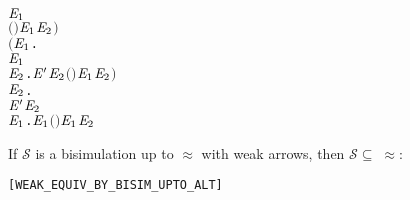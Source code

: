\begin{definition}
\begin{alltt}
                       \HOLTokenWeakTransBegin{} \HOLTokenWeakTransEnd \ensuremath{\HOLBoundVar{E}\sb{\mathrm{1}}} \HOLSymConst{\HOLTokenConj{}}
                      \ensuremath{(} \HOLSymConst{\HOLTokenRCompose{}}  \HOLSymConst{\HOLTokenRCompose{}} \ensuremath{)} \ensuremath{\HOLBoundVar{E}\sb{\mathrm{1}}} \ensuremath{\HOLBoundVar{E}\sb{\mathrm{2}}}\ensuremath{)} \HOLSymConst{\HOLTokenConj{}}
         \ensuremath{(}\HOLSymConst{\HOLTokenForall{}}\ensuremath{\HOLBoundVar{E}\sb{\mathrm{1}}}.
               \HOLTokenWeakTransBegin\HOLSymConst{\ensuremath{\tau}}\HOLTokenWeakTransEnd \ensuremath{\HOLBoundVar{E}\sb{\mathrm{1}}} \HOLSymConst{\HOLTokenImp{}}
              \HOLSymConst{\HOLTokenExists{}}\ensuremath{\HOLBoundVar{E}\sb{\mathrm{2}}}. \ensuremath{\HOLBoundVar{E}\sp{\prime}} \HOLSymConst{\HOLTokenEPS} \ensuremath{\HOLBoundVar{E}\sb{\mathrm{2}}} \HOLSymConst{\HOLTokenConj{}} \ensuremath{(} \HOLSymConst{\HOLTokenRCompose{}}  \HOLSymConst{\HOLTokenRCompose{}} \ensuremath{)} \ensuremath{\HOLBoundVar{E}\sb{\mathrm{1}}} \ensuremath{\HOLBoundVar{E}\sb{\mathrm{2}}}\ensuremath{)} \HOLSymConst{\HOLTokenConj{}}
         \HOLSymConst{\HOLTokenForall{}}\ensuremath{\HOLBoundVar{E}\sb{\mathrm{2}}}.
             \ensuremath{\HOLBoundVar{E}\sp{\prime}} \HOLTokenWeakTransBegin\HOLSymConst{\ensuremath{\tau}}\HOLTokenWeakTransEnd \ensuremath{\HOLBoundVar{E}\sb{\mathrm{2}}} \HOLSymConst{\HOLTokenImp{}}
             \HOLSymConst{\HOLTokenExists{}}\ensuremath{\HOLBoundVar{E}\sb{\mathrm{1}}}.  \HOLSymConst{\HOLTokenEPS} \ensuremath{\HOLBoundVar{E}\sb{\mathrm{1}}} \HOLSymConst{\HOLTokenConj{}} \ensuremath{(} \HOLSymConst{\HOLTokenRCompose{}}  \HOLSymConst{\HOLTokenRCompose{}} \ensuremath{)} \ensuremath{\HOLBoundVar{E}\sb{\mathrm{1}}} \ensuremath{\HOLBoundVar{E}\sb{\mathrm{2}}}
\end{alltt}
\end{definition}

\begin{theorem}
If $\mathcal{S}$ is a bisimulation up to $\approx$ with weak arrows, then
$\mathcal{S} \subseteq\;\approx$:
\begin{alltt}
\HOLTokenTurnstile{}   \HOLSymConst{\HOLTokenConj{}}    \HOLSymConst{\HOLTokenImp{}}  \HOLSymConst{\HOLTokenWeakEQ} \hfill{[WEAK_EQUIV_BY_BISIM_UPTO_ALT]}
\end{alltt}
\end{theorem}

